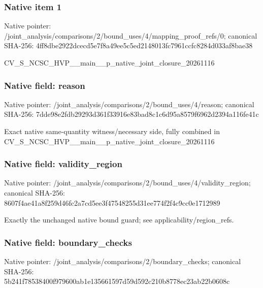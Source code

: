 \documentclass[10pt,a4paper]{article}
\begin{document}
\subsubsection{Native item 1}
Native pointer: /joint\_\allowbreak{}analysis/comparisons/2/bound\_\allowbreak{}uses/4/mapping\_\allowbreak{}proof\_\allowbreak{}refs/0; canonical SHA-256: 4ff8dbe2922dcecd5e7f8a49ee5c5ed2148013fc7961ccfc8284d033af8bae38

\begingroup\raggedright\sloppy CV\_\allowbreak{}S\_\allowbreak{}NCSC\_\allowbreak{}HVP\_\allowbreak{}\_\allowbreak{}main\_\allowbreak{}\_\allowbreak{}p\_\allowbreak{}native\_\allowbreak{}joint\_\allowbreak{}closure\_\allowbreak{}20261116\par\endgroup

\subsubsection{Native field: reason}
Native pointer: /joint\_\allowbreak{}analysis/comparisons/2/bound\_\allowbreak{}uses/4/reason; canonical SHA-256: 7dde98e2fdb29293d361f33916e83bad8c1c6d95a8579f6962d2394a116fe41c

\begingroup\raggedright\sloppy Exact native same-quantity witness/\allowbreak{}necessary side,\allowbreak{} fully combined in CV\_\allowbreak{}S\_\allowbreak{}NCSC\_\allowbreak{}HVP\_\allowbreak{}\_\allowbreak{}main\_\allowbreak{}\_\allowbreak{}p\_\allowbreak{}native\_\allowbreak{}joint\_\allowbreak{}closure\_\allowbreak{}20261116\par\endgroup

\subsubsection{Native field: validity\_\allowbreak{}region}
Native pointer: /joint\_\allowbreak{}analysis/comparisons/2/bound\_\allowbreak{}uses/4/validity\_\allowbreak{}region; canonical SHA-256: 8607f4ae41a8f259d46fc2a7cd5ee3f47548255d31ee774f2f4c9cc0e1712989

\begingroup\raggedright\sloppy Exactly the unchanged native bound guard;\allowbreak{} see applicability/\allowbreak{}region\_\allowbreak{}refs.\par\endgroup

\subsubsection{Native field: boundary\_\allowbreak{}checks}
Native pointer: /joint\_\allowbreak{}analysis/comparisons/2/boundary\_\allowbreak{}checks; canonical SHA-256: 5b241f78538400f979600ab1e135661597d59d592c210b8778ec23ab22b0608c
\end{document}
